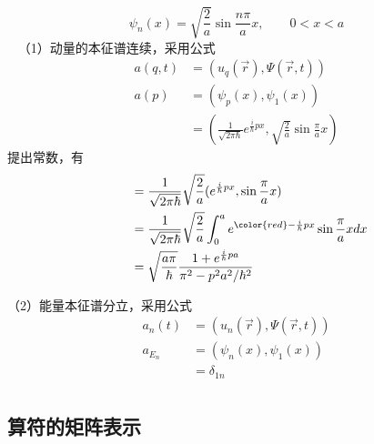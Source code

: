 \begin{frame} [allowframebreaks=]
        $$ \psi_n(x)=\sqrt{\frac{2}{a}} \sin \frac{n\pi}{a}x, \qquad 0<x<a $$
    \解~ （1）动量的本征谱连续，采用公式\\
    \begin{equation*}
        \begin{split}
            a(q,t)&=(u_q(\vec{r}), \Psi(\vec{r},t)) \\
            a(p)&= (\psi_{p}(x), \psi_1(x))\\
            &= (\frac{1}{\sqrt{2\pi\hbar}}e^{\frac{i}{\hbar}px}, \sqrt{\frac{2}{a}} \sin \frac{\pi}{a}x)
        \end{split} 
    \end{equation*}
    提出常数，有
    \begin{equation*}
        \begin{split}
          ~~~~~~&= \frac{1}{\sqrt{2\pi\hbar}}\sqrt{\frac{2}{a}} (e^{\frac{i}{\hbar}px},  \sin \frac{\pi}{a}x)\\
            &= \frac{1}{\sqrt{2\pi\hbar}}\sqrt{\frac{2}{a}} \int_0 ^a e^{{\color{red}-}\frac{i}{\hbar}px}\sin \frac{\pi}{a}x dx\\
            &=\sqrt{\frac{a\pi}{\hbar}} \frac{1+e^{\frac{i}{\hbar}pa}}{\pi^2-p^2a^2/\hbar^2}
        \end{split} 
    \end{equation*}

    （2）能量本征谱分立，采用公式\\
    \begin{equation*}
        \begin{split}
            a_n(t)&=(u_n(\vec{r}), \Psi(\vec{r},t)) \\
            a_{E_n}&=(\psi_n(x), \psi_1(x)) \\
            &=\delta_{1n} \\
        \end{split} 
    \end{equation*}  
\end{frame} 

\subsection{算符的矩阵表示}

